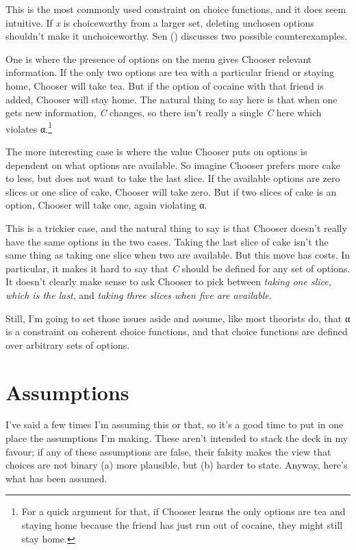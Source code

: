\documentclass[
  11pt,
  letterpaper,
  DIV=11,
  numbers=noendperiod,
  twoside]{scrartcl}
\begin{document}
This is the most commonly used constraint on choice functions, and it
does seem intuitive. If \emph{x} is choiceworthy from a larger set,
deleting unchosen options shouldn't make it unchoiceworthy. Sen
() discusses two
possible counterexamples.

One is where the presence of options on the menu gives Chooser relevant
information. If the only two options are tea with a particular friend or
staying home, Chooser will take tea. But if the option of cocaine with
that friend is added, Chooser will stay home. The natural thing to say
here is that when one gets new information, \emph{C} changes, so there
isn't really a single \emph{C} here which violates α.\footnote{For a
  quick argument for that, if Chooser learns the only options are tea
  and staying home because the friend has just run out of cocaine, they
  might still stay home.}

The more interesting case is where the value Chooser puts on options is
dependent on what options are available. So imagine Chooser prefers more
cake to less, but does not want to take the last slice. If the available
options are zero slices or one slice of cake, Chooser will take zero.
But if two slices of cake is an option, Chooser will take one, again
violating α.

This is a trickier case, and the natural thing to say is that Chooser
doesn't really have the same options in the two cases. Taking the last
slice of cake isn't the same thing as taking one slice when two are
available. But this move has costs. In particular, it makes it hard to
say that \emph{C} should be defined for any set of options. It doesn't
clearly make sense to ask Chooser to pick between \emph{taking one
slice, which is the last}, and \emph{taking three slices when five are
available}.

Still, I'm going to set those issues aside and assume, like most
theorists do, that α is a constraint on coherent choice functions, and
that choice functions are defined over arbitrary sets of options.

\section{Assumptions}\label{sec-assumptions}

I've said a few times I'm assuming this or that, so it's a good time to
put in one place the assumptions I'm making. These aren't intended to
stack the deck in my favour; if any of these assumptions are false,
their falsity makes the view that choices are not binary (a) more
plausible, but (b) harder to state. Anyway, here's what has been
assumed.
\end{document}
